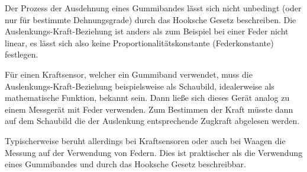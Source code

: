 \documentclass[a4paper, 12pt]{article}
\begin{document}
Der Prozess der Ausdehnung eines Gummibandes lässt sich nicht unbedingt (oder nur für bestimmte Dehnungsgrade) durch das Hooksche Gesetz beschreiben.
Die Auslenkungs-Kraft-Beziehung ist anders als zum Beispiel bei einer Feder nicht linear, es lässt sich also keine Proportionalitätskonstante (Federkonstante) festlegen.

Für einen Kraftsensor, welcher ein Gummiband verwendet, muss die Auslenkungs-Kraft-Beziehung beispielsweise als Schaubild, idealerweise als mathematische Funktion, bekannt sein. 
Dann ließe sich dieses Gerät analog zu einem Messgerät mit Feder verwenden. Zum Bestimmen der Kraft müsste dann auf dem Schaubild die der Auslenkung entsprechende Zugkraft abgelesen werden.

Typischerweise beruht allerdings bei Kraftsensoren oder auch bei Waagen die Messung auf der Verwendung von Federn. Dies ist praktischer als die Verwendung eines Gummibandes und durch das Hooksche Gesetz beschreibbar.
\end{document}
